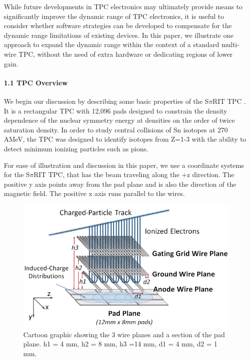 \documentclass[review]{elsarticle}
\begin{document}
While future developments in TPC electronics may ultimately provide means to significantly improve the dynamic range of TPC electronics, it is useful to consider whether software strategies can be developed to compensate for the dynamic range limitations of existing devices. In this paper, we illustrate one approach to expand the dynamic range within the context of a standard multi-wire TPC, without the need of extra hardware or dedicating regions of lower gain.


\paragraph{1.1 TPC Overview}
We begin our discussion by describing some basic properties of the S$\pi$RIT TPC \citep{shane}. It is a rectangular TPC with 12,096 pads designed to constrain the density dependence of the nuclear symmetry energy at densities on the order of twice saturation density. In order to study central collisions of Sn isotopes at 270 AMeV, the TPC was designed to identify isotopes from Z=1-3 with the ability to detect minimum ionizing particles such as pions. 

For ease of illustration and discussion in this paper, we use a coordinate systems for the S$\pi$RIT TPC, that has the beam traveling along the +z direction. The positive y axis points away from the pad plane and is also the direction of the magnetic field. The positive x axis runs parallel to the wires. 

\begin{figure}[ht!]
\includegraphics[width=\linewidth]{padwire}
\caption{Cartoon graphic showing the 3 wire planes and a section of the pad plane. h1 = 4 mm, h2 = 8 mm, h3 =14 mm, d1 = 4 mm, d2 = 1 mm.}
\label{fig:padwire}
\end{figure}
\end{document}
